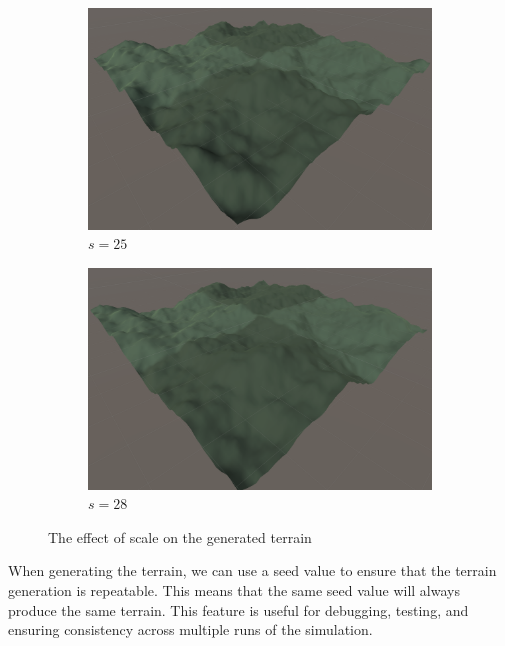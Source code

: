 \documentclass[12pt]{article}
\begin{document}
\begin{figure}[ht]
    \centering
    \begin{subfigure}{0.45\textwidth}
        \centering
        \includegraphics[width=\linewidth]{scale25.png}
        \caption{$s=25$}
        \label{fig:scale25}
    \end{subfigure}
    \hfill
    \begin{subfigure}{0.45\textwidth}
        \centering
        \includegraphics[width=\linewidth]{scale28.png}
        \caption{$s=28$}
        \label{fig:scale28}
    \end{subfigure}
    \caption{The effect of scale on the generated terrain}
    \label{fig:scale}
\end{figure}

When generating the terrain, we can use a seed value to ensure that the terrain generation is repeatable. This means that the same seed value will always produce the same terrain. This feature is useful for debugging, testing, and ensuring consistency across multiple runs of the simulation.
\end{document}
